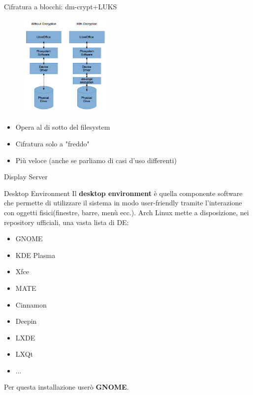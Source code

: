 \begin{frame}{Cifratura a blocchi: dm-crypt+LUKS}
    \begin{figure}[h]
        \includegraphics[width=0.4\textwidth]{images/dm-crypt.png}
    \end{figure}
\begin{itemize}
    \item Opera al di sotto del filesystem
    \item Cifratura solo a "freddo"
    \item Più veloce (anche se parliamo di casi d'uso differenti)
\end{itemize}
\end{frame}

\begin{frame}{Display Server}
\end{frame}

\begin{frame}{Desktop Environment}
Il \textbf{desktop environment} è quella componente software che permette di utilizzare il sistema in modo user-friendly
tramite l'interazione con oggetti fisici(finestre, barre, menù ecc.). Arch Linux mette a disposizione, nei repository ufficiali,
una vasta lista di DE:
\begin{itemize}
    \item GNOME
    \item KDE Plasma
    \item Xfce
    \item MATE
    \item Cinnamon
    \item Deepin
    \item LXDE
    \item LXQt
    \item ...
\end{itemize}
Per questa installazione userò \textbf{GNOME}.
\end{frame}

